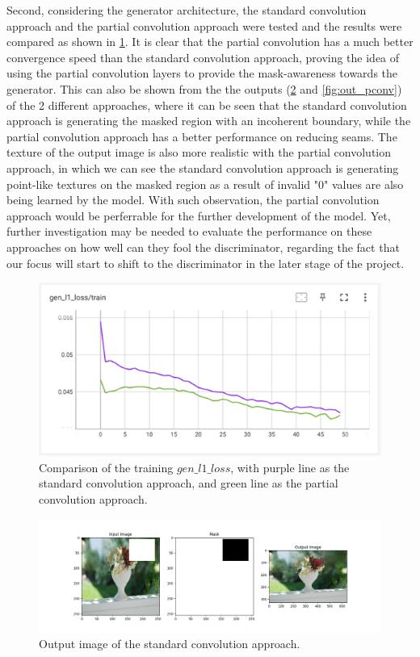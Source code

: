 \documentclass[10pt,twocolumn,letterpaper]{article}
\begin{document}
Second, considering the generator architecture, the standard convolution approach and the partial convolution approach were tested and the results were compared as shown in \cref{fig:stand_vs_pconv}. It is 
clear that the partial convolution has a much better convergence speed than the standard convolution approach, proving the idea of using the partial convolution layers to provide the mask-awareness towards 
the generator. This can also be shown from the the outputs (\cref{fig:out_standconv} and \cref{fig:out_pconv}) of the 2 different approaches, where it can be seen that the standard convolution approach is 
generating the masked region with an incoherent boundary, while the partial convolution approach has a better performance on reducing seams. The texture of the output image is also more realistic with the 
partial convolution approach, in which we can see the standard convolution approach is generating point-like textures on the masked region as a result of invalid "0" values are also being learned by the model. 
With such observation, the partial convolution approach would be perferrable for the further development of the model. Yet, further investigation may be needed to evaluate the performance on these approaches 
on how well can they fool the discriminator, regarding the fact that our focus will start to shift to the discriminator in the later stage of the project.

\begin{figure}[t]
    \centering
    \includegraphics[width=\linewidth]{figures/milestone/stand_vs_pconv.png}
    \caption{Comparison of the training $gen\_l1\_loss$, with purple line as the standard convolution approach, and green line as the partial convolution approach.}
    \label{fig:stand_vs_pconv}
\end{figure}

\begin{figure}[t]
    \centering
    \includegraphics[width=\linewidth]{figures/milestone/out_standconv.png}
    \caption{Output image of the standard convolution approach.}
    \label{fig:out_standconv}
\end{figure}
\end{document}
